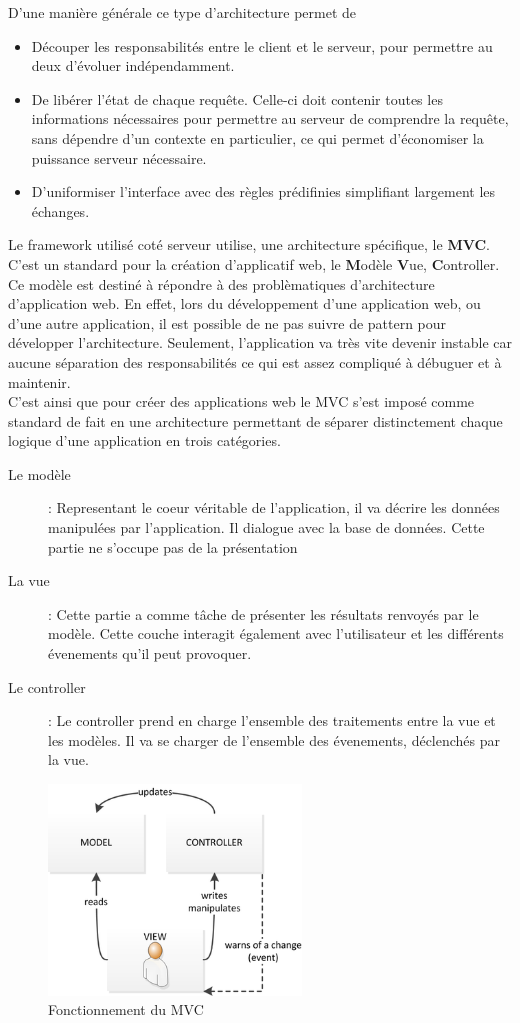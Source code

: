 \documentclass{report}
\newcommand{\jumpOne}{\\[1\baselineskip]}
\begin{document}
\newpage
D'une manière générale ce type d'architecture permet de  
\begin{itemize}
	\item Découper les responsabilités entre le client et le serveur, pour permettre au deux d'évoluer indépendamment. 
	\item De libérer l'état de chaque requête. Celle-ci doit contenir toutes les informations nécessaires pour permettre au serveur de comprendre la requête, sans dépendre d'un contexte en particulier, ce qui permet d'économiser la puissance serveur nécessaire. 
	\item D'uniformiser l'interface avec des règles prédifinies simplifiant largement les échanges. 
\end{itemize}
Le \gls{framework} utilisé coté serveur utilise, une architecture spécifique, le \textbf{MVC}.
C'est un standard pour la création d'applicatif web, le \textbf{M}odèle \textbf{V}ue, \textbf{C}ontroller. 
\jumpOne
Ce modèle est destiné à répondre à des problèmatiques d'architecture d'application web. En effet, lors du développement d'une application web, ou d'une autre application, il est possible de ne pas suivre de pattern pour développer l'architecture. Seulement, l'application va très vite devenir instable car aucune séparation des responsabilités ce qui est assez compliqué à débuguer et à maintenir.
\jumpOne 
C'est ainsi que pour créer des applications web le \gls{MVC} s'est imposé comme standard de fait en une architecture permettant de séparer distinctement chaque logique d'une application en trois catégories.  
\begin{description}
   	\item[Le modèle] : Representant le coeur véritable de l'application, il va décrire les données manipulées par l'application. Il dialogue avec la base de données. Cette partie ne s'occupe pas de la présentation
   	\item[La vue] : Cette partie a comme tâche de présenter les résultats renvoyés par le modèle. Cette couche interagit également avec l'utilisateur et les différents évenements qu'il peut provoquer. 
   	\item[Le controller] :  Le controller prend en charge l'ensemble des traitements entre la vue et les modèles. Il va se charger de l'ensemble des évenements, déclenchés par la vue. 
   \end{description}   

\begin{figure}[h!]
	\centering
	\includegraphics[width=0.6\textwidth]{assets/mvc.png}
	\caption{Fonctionnement du MVC}
\end{figure}
\end{document}

